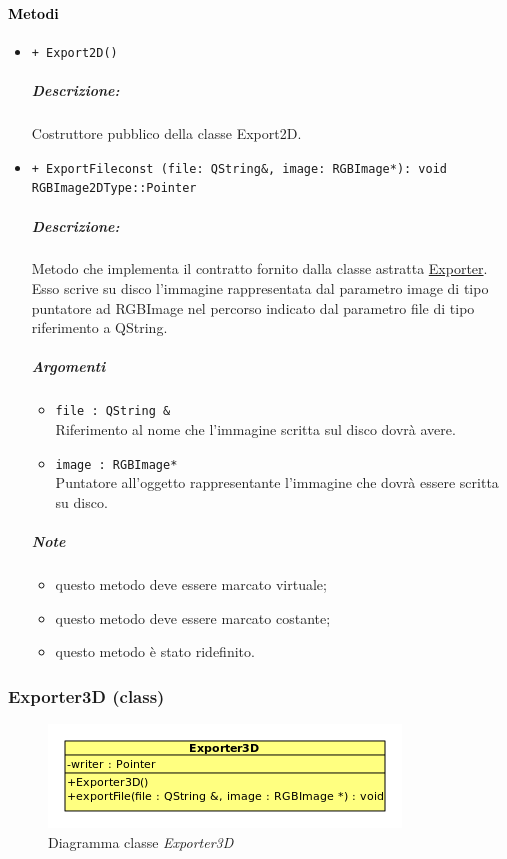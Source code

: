 \paragraph{\textcolor{black}{Metodi}}
	\begin{itemize}
		\item \color{blue}\verb!+ Export2D()!
		\color{black}
		\subparagraph{Descrizione:} Costruttore pubblico della classe Export2D.


		\item \color{blue}\verb!+ ExportFileconst (file: QString&, image: RGBImage*): void RGBImage2DType::Pointer!
		\color{black}
		\subparagraph{Descrizione:} Metodo che implementa il contratto fornito dalla classe astratta \hyperref[spexporter]{Exporter}. Esso scrive su disco l'immagine rappresentata dal parametro image di tipo puntatore ad RGBImage nel percorso indicato dal parametro file di tipo riferimento a QString.

		\subparagraph{Argomenti}
			\begin{itemize}
				\item \color{RoyalPurple}\verb!file : QString &! \\ 
				\color{black}Riferimento al nome che l'immagine scritta sul disco dovrà avere.
				\item \color{RoyalPurple}\verb!image : RGBImage*! \\ 
				\color{black}Puntatore all'oggetto rappresentante l'immagine che dovrà essere scritta su disco.
			\end{itemize}
\color{black}
		\subparagraph{Note}
			\begin{itemize}
				\item questo metodo deve essere marcato virtuale;
				\item questo metodo deve essere marcato costante;
				\item questo metodo è stato ridefinito.
			\end{itemize} 
	\end{itemize}
\color{black}

\pagebreak
\subsubsection{Exporter3D (class)}
\label{spexporter3d}
\begin{figure}[!h]
\centering
			\includegraphics[scale=5]{./Content/Immagini/model/Exporter3D.png}
			\caption{Diagramma classe \textsl{Exporter3D}}
			\label{cl_exporter3d}
\end{figure}
